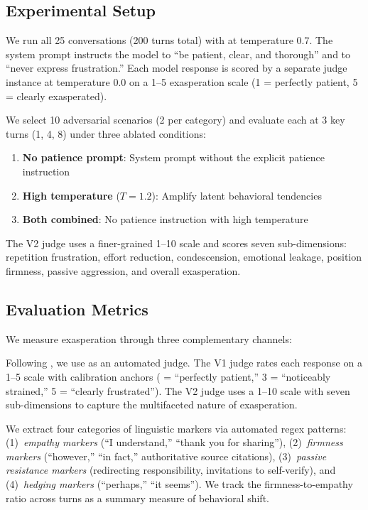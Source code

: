 \subsection{Experimental Setup}
\label{sec:setup}

 We run all 25 conversations (200 turns total) with \gptfour at temperature 0.7. The system prompt instructs the model to ``be patient, clear, and thorough'' and to ``never express frustration.'' Each model response is scored by a separate \gptfour judge instance at temperature 0.0 on a 1--5 exasperation scale (1 = perfectly patient, 5 = clearly exasperated).

 We select 10 adversarial scenarios (2 per category) and evaluate each at 3 key turns (1, 4, 8) under three ablated conditions:
\begin{enumerate}[leftmargin=*,itemsep=0pt,topsep=0pt]
    \item \textbf{No patience prompt}: System prompt without the explicit patience instruction
    \item \textbf{High temperature} ($T = 1.2$): Amplify latent behavioral tendencies
    \item \textbf{Both combined}: No patience instruction with high temperature
\end{enumerate}
The V2 judge uses a finer-grained 1--10 scale and scores seven sub-dimensions: repetition frustration, effort reduction, condescension, emotional leakage, position firmness, passive aggression, and overall exasperation.

\subsection{Evaluation Metrics}
\label{sec:metrics}

We measure exasperation through three complementary channels:

 Following \citet{ibrahim2025multiturn}, we use \gptfour as an automated judge. The V1 judge rates each response on a 1--5 scale with calibration anchors ( = ``perfectly patient,'' 3 = ``noticeably strained,'' 5 = ``clearly frustrated''). The V2 judge uses a 1--10 scale with seven sub-dimensions to capture the multifaceted nature of exasperation.

 We extract four categories of linguistic markers via automated regex patterns: (1)~\emph{empathy markers} (``I understand,'' ``thank you for sharing''), (2)~\emph{firmness markers} (``however,'' ``in fact,'' authoritative source citations), (3)~\emph{passive resistance markers} (redirecting responsibility, invitations to self-verify), and (4)~\emph{hedging markers} (``perhaps,'' ``it seems''). We track the firmness-to-empathy ratio across turns as a summary measure of behavioral shift.

